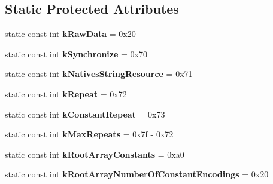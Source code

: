 \subsection*{Static Protected Attributes}
\begin{DoxyCompactItemize}
\item 
\hypertarget{classv8_1_1internal_1_1_serializer_deserializer_a7e06e12cfff472ed408a3434a4113c08}{}static const int {\bfseries k\+Raw\+Data} = 0x20\label{classv8_1_1internal_1_1_serializer_deserializer_a7e06e12cfff472ed408a3434a4113c08}

\item 
\hypertarget{classv8_1_1internal_1_1_serializer_deserializer_acf9a26e618353660c6a05a183702a986}{}static const int {\bfseries k\+Synchronize} = 0x70\label{classv8_1_1internal_1_1_serializer_deserializer_acf9a26e618353660c6a05a183702a986}

\item 
\hypertarget{classv8_1_1internal_1_1_serializer_deserializer_a75aed83ddc1ba8d7ba6ce73f371ae525}{}static const int {\bfseries k\+Natives\+String\+Resource} = 0x71\label{classv8_1_1internal_1_1_serializer_deserializer_a75aed83ddc1ba8d7ba6ce73f371ae525}

\item 
\hypertarget{classv8_1_1internal_1_1_serializer_deserializer_a6423142da0ee1efd444434e88f3d27ec}{}static const int {\bfseries k\+Repeat} = 0x72\label{classv8_1_1internal_1_1_serializer_deserializer_a6423142da0ee1efd444434e88f3d27ec}

\item 
\hypertarget{classv8_1_1internal_1_1_serializer_deserializer_ac6f22c497613284ef898fff5ef1f6e19}{}static const int {\bfseries k\+Constant\+Repeat} = 0x73\label{classv8_1_1internal_1_1_serializer_deserializer_ac6f22c497613284ef898fff5ef1f6e19}

\item 
\hypertarget{classv8_1_1internal_1_1_serializer_deserializer_aac79c7c8ec1d741103e16d7b29a2d4bc}{}static const int {\bfseries k\+Max\+Repeats} = 0x7f -\/ 0x72\label{classv8_1_1internal_1_1_serializer_deserializer_aac79c7c8ec1d741103e16d7b29a2d4bc}

\item 
\hypertarget{classv8_1_1internal_1_1_serializer_deserializer_aaaefa35d32258743ccdecf01cd4c80d3}{}static const int {\bfseries k\+Root\+Array\+Constants} = 0xa0\label{classv8_1_1internal_1_1_serializer_deserializer_aaaefa35d32258743ccdecf01cd4c80d3}

\item 
\hypertarget{classv8_1_1internal_1_1_serializer_deserializer_a8979a9dd1c0177f36842cddb902a10b2}{}static const int {\bfseries k\+Root\+Array\+Number\+Of\+Constant\+Encodings} = 0x20\label{classv8_1_1internal_1_1_serializer_deserializer_a8979a9dd1c0177f36842cddb902a10b2}


\end{DoxyCompactItemize}
